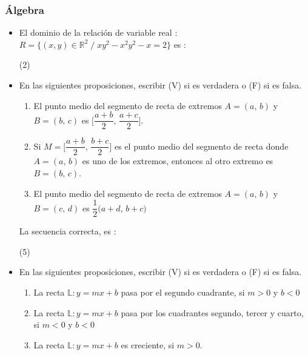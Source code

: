\documentclass[10pt, twocolumn, landscape, a4paper]{article}
\begin{document}
\subsubsection*{Álgebra}
\begin{itemize}
\item{El dominio de la relación de variable real : \\ $R = \big\{ (x,y) \in \mathbb{R}^2\;/\;xy^2 - x^2y^2 - x = 2 \big\}$ es : 
\begin{tasks}(2)
\task{$\big< -\!\infty,\;- 2\big]  \cup \big<0, 1\big>$}
\task{$\big< -\!\infty,\;- 2\big]  \cup \big[ 0, 1\big>$}
\task{$\big< -\!\infty,\;- 2\big>  \cup \big<0, 1\big]$}
\task{$\big< -\!\infty,\;- 2\big>  \cup \big[0, 1\big]$}
\end{tasks}
}
\item{En las siguientes proposiciones, escribir (\textrm{V}) si es verdadera o (\textrm{F}) si es falsa.
\begin{enumerate}[label=\roman*.]
\item{El punto medio del segmento de recta de extremos $A = (a,\,b)$ y \\ $B = (b,\,c)$ es $\Bigg[\dfrac{a + b}{2},\,\dfrac{a + c}{2}\Bigg]$.}
\item{Si \quad$M = \Bigg[\dfrac{a + b}{2},\,\dfrac{b + c}{2}\Bigg]$ es el punto medio del segmento de recta donde $A = (a,\,b)$ es uno de los extremos, entonces al otro extremo es $B = (b,\,c)$.}
\item{El punto medio del segmento de recta de extremos $A = (a,\,b)$ y \\ $B = (c,\,d)$ es $\dfrac1{2}\big(a + d,\,b + c\big)$ }
\end{enumerate}
La secuencia correcta, es :
\begin{tasks}(5)
\end{tasks}
}
\item{En las siguientes proposiciones, escribir (\textrm{V}) si es verdadera o (\textrm{F}) si es falsa.
\begin{enumerate}[label=\roman*.]
\item{La recta \;$\mathbb{L} : y = mx + b$\; pasa por el segundo cuadrante, si $m > 0$ y $b < 0$}
\item{La recta $\mathbb{L} : y = mx + b$ pasa por los cuadrantes segundo, tercer y cuarto, si $m < 0$ y $b < 0$}
\item{La recta $\mathbb{L} : y = mx + b$ es creciente, si $m > 0$.}
\end{enumerate}
}
\end{itemize}
\end{document}
